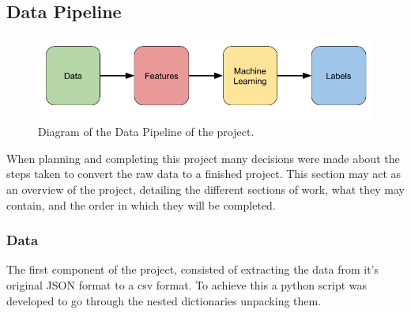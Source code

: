 \documentclass{article}
\begin{document}



\subsection{Data Pipeline}

\begin{figure}[ht!]
    \centering
    \includegraphics[scale=0.5]{Images/Data-Pipeline.png}
    \caption{Diagram of the Data Pipeline of the project.}
    \label{fig:test}
\end{figure}

When planning and completing this project many decisions were made about the steps taken to convert the raw data to a finished project.
This section may act as an overview of the project, detailing the different sections of work, what they may contain, and the order in which they will be completed.



\subsubsection{Data}



The first component of the project, consisted of extracting the data from it's original JSON format to a csv format.
To achieve this a python script was developed to go through the nested dictionaries unpacking them.
\end{document}
